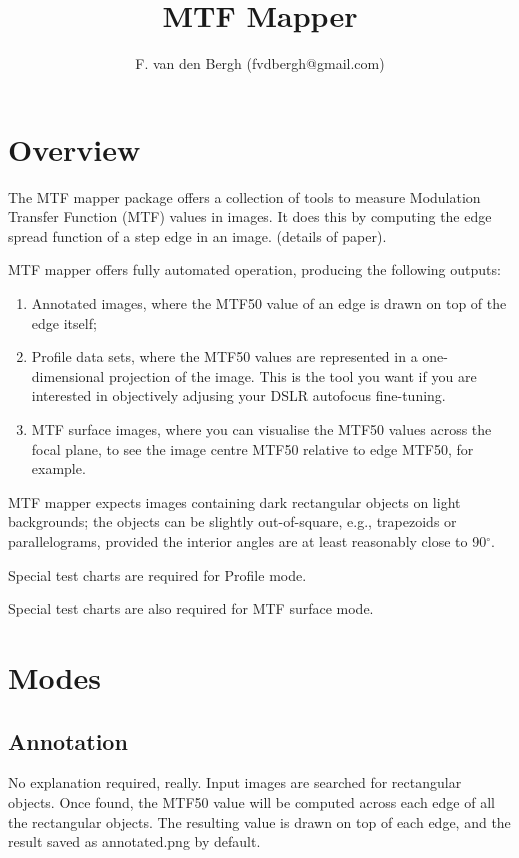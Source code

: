 \documentclass[a4paper]{article}
\title{MTF Mapper}
\author{F. van den Bergh (fvdbergh@gmail.com)}
\begin{document}
\maketitle

\section{Overview}
The MTF mapper package offers a collection of tools to measure Modulation
Transfer Function (MTF) values in images. It does this by computing the edge
spread function of a step edge in an image. (details of paper).

MTF mapper offers fully automated operation, producing the following
outputs:
\begin{enumerate}
    \item Annotated images, where the MTF50 value of an edge is drawn on top
of the edge itself;
    \item Profile data sets, where the MTF50 values are represented in a
one-dimensional projection of the image. This is the tool you want if you
are interested in objectively adjusing your DSLR autofocus fine-tuning.
    \item MTF surface images, where you can visualise the MTF50 values
across the focal plane, to see the image centre MTF50 relative to edge MTF50,
for example.
\end{enumerate}

MTF mapper expects images containing dark rectangular objects on light
backgrounds; the objects can be slightly out-of-square, e.g., trapezoids or
parallelograms, provided the interior angles are at least reasonably close
to 90$^\circ$.

Special test charts are required for Profile mode.

Special test charts are also required for MTF surface mode.

\section{Modes}
\subsection{Annotation}
No explanation required, really. Input images are searched for rectangular
objects. Once found, the MTF50 value will be computed across each edge of
all the rectangular objects. The resulting value is drawn on top of each
edge, and the result saved as \textrm{annotated.png} by default.
\end{document}
